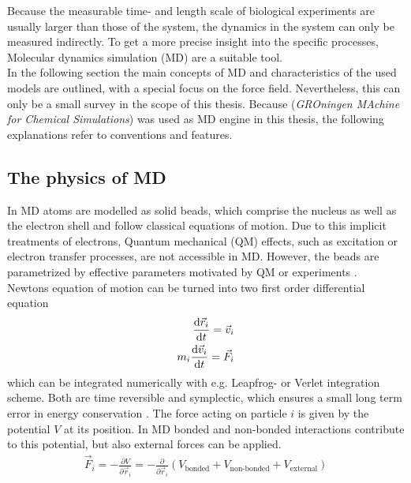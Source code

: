 Because the measurable time- and length scale of biological experiments are usually larger than those of the system, the dynamics in the system can only be measured indirectly. To get a more precise insight into the specific processes, Molecular dynamics simulation (MD) are a suitable tool.\\
In the following section the main concepts of MD and characteristics of the used models are outlined, with a special focus on the \martini{} force field. Nevertheless, this can only be a small survey in the scope of this thesis. Because \gromacs{} (\textit{GROningen MAchine for Chemical Simulations}) \autocites{gromacs1, gromacsManual} was used as MD engine in this thesis, the following explanations refer to \gromacs{} conventions and features. 
\subsection{The physics of MD}
In MD atoms are modelled as solid beads, which comprise the nucleus as well as the electron shell and follow classical equations of motion. Due to this implicit treatments of electrons, Quantum mechanical (QM) effects, such as excitation or electron transfer processes, are not accessible in MD. However, the beads are parametrized by effective parameters motivated by QM or experiments \autocite[p. 127f]{greenBook}.\\
Newtons equation of motion can be turned into two first order differential equation
\begin{align}
	\label{eq:eq_of_mot_first_order}
	\frac{\text{d} \vec{r}_i}{\text{d} t} = \vec{v}_i \\
	m_i \frac{\text{d} \vec{v}_i}{\text{d} t} = \vec{F}_i
\end{align}
which can be integrated numerically with e.g. Leapfrog- or Verlet integration scheme. Both are time reversible and symplectic, which ensures a small long term error in energy conservation \autocite[p. 72ff]{UnderstandingMD}. The force acting on particle $i$ is given by the potential $V$ at its position. In MD bonded and non-bonded interactions contribute to this potential, but also external forces can be applied.
\begin{align}
	\vec{F}_i = - \frac{\partial V}{\partial \vec{r}_i} = - \frac{\partial}{\partial \vec{r}_i} \left(V_\text{bonded} + V_\text{non-bonded} + V_\text{external}\right)
\end{align}
